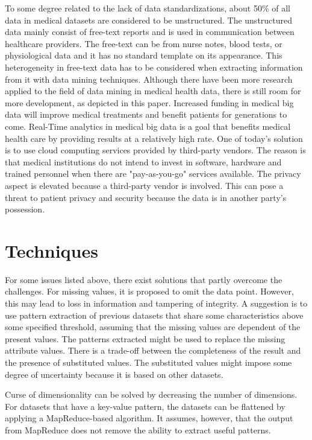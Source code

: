 To some degree related to the lack of data standardizations, about 50\% of all data in medical datasets are considered to be unstructured\cite{wp}. The unstructured data mainly consist of free-text reports and is used in communication between healthcare providers. The free-text can be from nurse notes, blood tests, or physiological data and it has no standard template on its appearance. This heterogeneity in free-text data has to be considered when extracting information from it with data mining techniques. 
 Although there have been more research applied to the field of data mining in medical health data, there is still room for more development, as depicted in this paper. Increased funding in medical big data will improve medical treatments and benefit patients for generations to come. 
Real-Time analytics in medical big data is a goal that benefits medical health care by providing results at a relatively high rate.\cite{kek} One of today’s solution is to use cloud computing services provided by third-party vendors. The reason is that medical institutions do not intend to invest in software, hardware and trained personnel when there are "pay-as-you-go" services available\cite{motivation1}. The privacy aspect is elevated because a third-party vendor is involved.
This can pose a threat to patient privacy and security because the data is in another party's possession.


\section{Techniques}

For some issues listed above, there exist solutions that partly overcome the challenges. For missing values, it is proposed to omit the data point. However, this may lead to loss in information and tampering of integrity. A suggestion is to use pattern extraction of previous datasets that share some characteristics above some specified threshold, assuming that the missing values are dependent of the present values. The patterns extracted might be used to replace the missing attribute values. There is a trade-off between the completeness of the result and the presence of substituted values. The substituted values might impose some degree of uncertainty because it is based on other datasets. 

Curse of dimensionality can be solved by decreasing the number of dimensions. For datasets that have a key-value pattern, the datasets can be flattened by applying a MapReduce-based algorithm. It assumes, however, that the output from MapReduce does not remove the ability to extract useful patterns.

